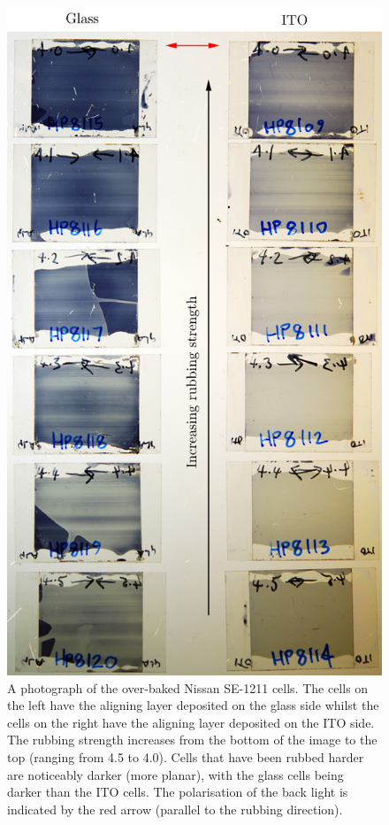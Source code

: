 \begin{figure}
\begin{center}
\includegraphics{Figures/Pretilt/cells}
\end{center}
\caption[Photograph of cells fabricated using over-baked Nissan SE-1211]{\label{fig:cells}{A photograph of the over-baked Nissan SE-1211 cells. The cells on the left have the aligning layer deposited on the glass side whilst the cells on the right have the aligning layer deposited on the ITO side. The rubbing strength increases from the bottom of the image to the top (ranging from 4.5 to 4.0). Cells that have been rubbed harder are noticeably darker (more planar), with the glass cells being darker than the ITO cells}. The polarisation of the back light is indicated by the red arrow (parallel to the rubbing direction).}
\end{figure}

